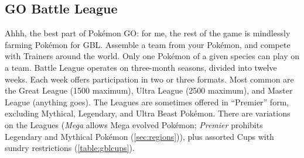 \subsection{GO Battle League\label{subsec:league}}
Ahhh, the best part of Pokémon GO: for me, the rest of the game is mindlessly farming Pokémon for GBL\@.
Assemble a team from your Pokémon, and compete with Trainers around the world.
Only one Pokémon of a given species can play on a team.
Battle League operates on three-month seasons, divided into twelve weeks.
Each week offers participation in two or three formats.
Most common are the Great League (1500 \CP{} maximum), Ultra League (2500 \CP{} maximum),
 and Master League (anything goes).
The Leagues are sometimes offered in ``Premier'' form, excluding Mythical, Legendary, and Ultra Beast Pokémon.
There are variations on the Leagues (\textit{Mega} allows Mega evolved Pokémon;
 \textit{Premier} prohibits Legendary and Mythical Pokémon (\autoref{sec:regions})),
 plus assorted Cups with sundry restrictions (\autoref{table:gblcups}).
